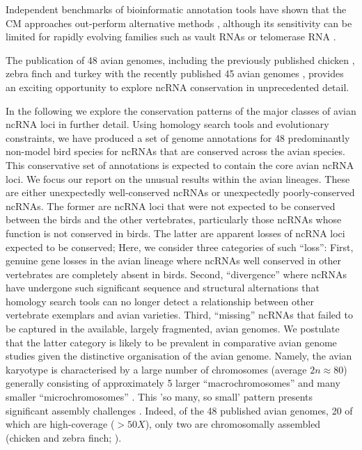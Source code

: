 \documentclass[10pt]{bmc_article}
\newenvironment{bmcformat}{\begin{raggedright}\baselineskip20pt\sloppy\setboolean{publ}{false}}{\end{raggedright}\baselineskip20pt\sloppy}
\begin{document}
\begin{bmcformat}
Independent benchmarks of bioinformatic annotation tools have shown
that the CM approaches out-perform alternative methods
\cite{Freyhult:2007}, although its sensitivity can be limited for
rapidly evolving families such as vault RNAs or telomerase RNA
\cite{Menzel:09a}.



The publication of 48 avian genomes, including the previously
published chicken
\cite{International_Chicken_Genome_Sequencing_Consortium:2004}, zebra
finch \cite{Warren:2010} and turkey \cite{Dalloul:2010} with the
recently published 45 avian genomes
\cite{birds:14,birds:14a,Huang:2013,Zhan:2013,Shapiro:2013,Howard:2013,Li:2014},
provides an exciting opportunity to explore ncRNA conservation in
unprecedented detail.

In the following we explore the conservation patterns of the major
classes of avian ncRNA loci in further detail.  Using homology search
tools and evolutionary constraints, we have produced a set of genome
annotations for 48 predominantly non-model bird species for ncRNAs
that are conserved across the avian species. This conservative set of
annotations is expected to contain the core avian ncRNA loci. We focus
our report on the unusual results within the avian lineages. These are
either unexpectedly well-conserved ncRNAs or unexpectedly
poorly-conserved ncRNAs. The former are ncRNA loci that were not
expected to be conserved between the birds and the other vertebrates,
particularly those ncRNAs whose function is not conserved in birds.
The latter are apparent losses of ncRNA loci expected to be conserved;
Here, we consider three categories of such ``loss'': First, genuine
gene losses in the avian lineage where ncRNAs well conserved in other
vertebrates are completely absent in birds.  Second, ``divergence''
where ncRNAs have undergone such significant sequence and structural
alternations that homology search tools can no longer detect a
relationship between other vertebrate exemplars and avian varieties.
Third, ``missing'' ncRNAs that failed to be captured in the available,
largely fragmented, avian genomes.  We postulate that the latter
category is likely to be prevalent in comparative avian genome studies
given the distinctive organisation of the avian genome. Namely, the
avian karyotype is characterised by a large number of chromosomes
(average $2n \approx 80$) generally consisting of approximately 5
larger ``macrochromosomes'' and many smaller ``microchromosomes''
\cite{Griffin:2007}. This ’so many, so small’ pattern presents
significant assembly challenges \cite{Ellegren:2005}. Indeed, of the
48 published avian genomes, 20 of which are high-coverage ($>50X$),
only two are chromosomally assembled (chicken and zebra finch;
\cite{birds:14,Warren:2010}).




\end{bmcformat}
\end{document}
